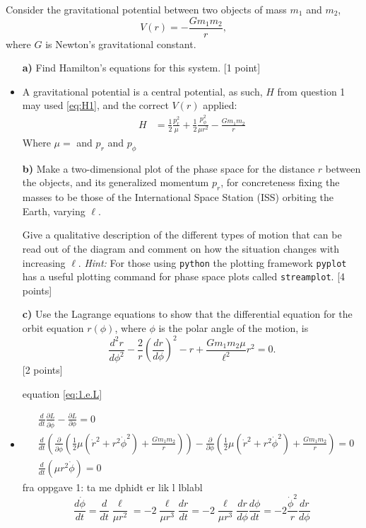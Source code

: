 \documentclass[11pt,a4paper]{report}
\newcounter{excount}[chapter]
\newenvironment{exercise}[1][]{\addtocounter{excount}{1} \noindent {\bf Question
    \arabic{excount} \ \ #1}\hspace{2mm}}{\vspace{4mm}}
\begin{document}
\begin{exercise}{\bf Orbital motion\\}
Consider the gravitational potential between two objects of mass $m_1$ and $m_2$,
\begin{equation}
V(r)=-\frac{Gm_1m_2}{r},\label{eq:grav_pot}
\end{equation}
where $G$ is Newton's gravitational constant.
\begin{itemize}
\item[{\bf a)}] Find Hamilton's equations for this system. [1 point]
\item A gravitational potential is a central potential, as such, $H$ from question 1 may used \eqref{eq:H1}, and the correct $V(r)$ applied:
\begin{align}
H &=  \frac{1}{2} \frac{p_r^2}{\mu}  +\frac{1}{2}\frac{p_\phi^2}{\mu r^2}  -\frac{Gm_1m_2}{r}
\end{align}
Where $\mu=$ and $p_r$ and $p_\phi$
 \item[{\bf b)}] Make a two-dimensional plot of the phase space for the distance $r$ between the objects, and its generalized momentum $p_r$, for concreteness fixing the masses to be those of the International Space Station (ISS) orbiting the Earth, varying $\ell$.

Give a qualitative description of the different types of motion that can be read out of the diagram and comment on how the situation changes with increasing $\ell$. {\it Hint:} For those using {\tt python} the plotting framework {\tt pyplot} has a useful plotting command for phase space plots called {\tt streamplot}.  [4 points]
\item[{\bf c)}] Use the Lagrange equations to show that the differential equation for the orbit equation $r(\phi)$, where $\phi$ is the polar angle of the motion, is
\begin{equation}
\frac{d^2r}{d\phi^2}-\frac{2}{ r}\left(\frac{dr}{d\phi}\right)^2-r+\frac{Gm_1m_2\mu }{\ell^2}r^2=0. \label{eq:2c.diffeq}
\end{equation}
[2 points]

equation \eqref{eq:1.e.L}
\item \begin{align}
&\frac{d}{dt}\frac{\partial L}{\partial \dot{\phi}}-\frac{\partial L}{\partial \phi}=0 \\
&\frac{d}{dt} \left( \frac{\partial }{\partial \dot{\phi}} \left( \frac{1}{2}\mu (\dot{r}^2+r^2\dot{\phi}^2)+\frac{Gm_1m_2}{r} \right) \right) -\frac{\partial }{\partial \phi} \left( \frac{1}{2}\mu (\dot{r}^2+r^2\dot{\phi}^2)+\frac{Gm_1m_2}{r} \right)=0\\
&\frac{d}{dt} \left( \mu r^2\dot{\phi} \right)=0
\end{align} 
fra oppgave 1:
ta me dphidt er lik l lblabl
\begin{equation}
\frac{d \dot{\phi}}{dt}= \frac{d}{dt} \frac{\ell}{\mu r^2}=-2\frac{\ell}{\mu r^3}\frac{dr}{dt}=-2\frac{\ell}{\mu r^3}\frac{dr}{d\phi}\frac{d\phi}{dt}=-2 \frac{\dot{\phi}^2}{r} \frac{dr}{d\phi}
\end{equation}


\end{itemize}
\end{exercise}
\end{document}
